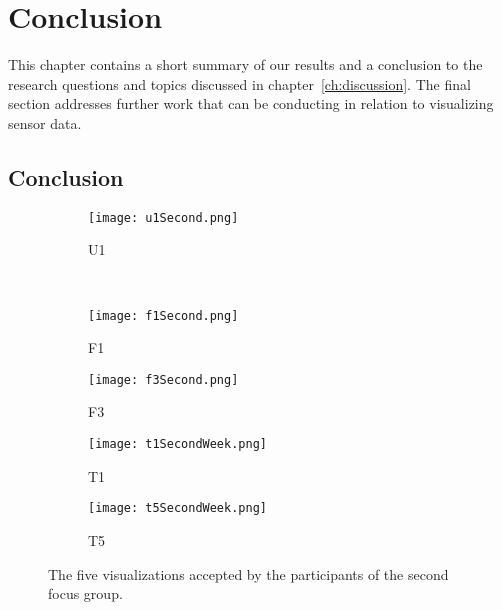 \chapter{Conclusion}
This chapter contains a short summary of our results and a conclusion to the research questions and topics discussed in chapter~\ref{ch:discussion}. The final section addresses further work that can be conducting in relation to visualizing sensor data.
\section{Conclusion}

\begin{figure}[h!]
  \begin{subfigure}[b]{0.4\textwidth}
    \centering
    \texttt{[image: u1Second.png]}
    \caption{U1}
  \end{subfigure} 
  \\
  \begin{subfigure}[b]{0.49\textwidth}
    \centering
    \texttt{[image: f1Second.png]}
    \caption{F1}
  \end{subfigure} 
  \begin{subfigure}[b]{0.49\textwidth}
    \centering
    \texttt{[image: f3Second.png]}
    \caption{F3}
  \end{subfigure}
  \begin{subfigure}[b]{0.49\textwidth}
    \centering
    \texttt{[image: t1SecondWeek.png]}
    \caption{T1}
  \end{subfigure} 
  \begin{subfigure}[b]{0.49\textwidth}
    \centering
    \texttt{[image: t5SecondWeek.png]}
    \caption{T5}
  \end{subfigure}
  \caption{The five visualizations accepted by the participants of the second focus group.}
  \label{fig:visualizations}
\end{figure}

